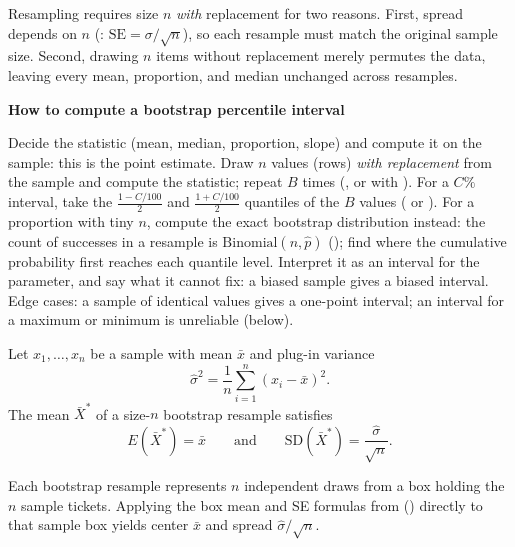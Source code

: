 \documentclass[10pt]{scrartcl}
\newenvironment{howto}[1]{\begin{mdframed}[style=howtostyle]{\color{NavyBlue}\textbf{#1}}\par\vspace{2pt}}{\end{mdframed}}
\begin{document}
Resampling requires size $n$ \emph{with} replacement for two reasons. First, spread depends on $n$ (: $\mathrm{SE} = \sigma/\sqrt{n}$), so each resample must match the original sample size. Second, drawing $n$ items without replacement merely permutes the data, leaving every mean, proportion, and median unchanged across resamples.

\begin{howto}{How to compute a bootstrap percentile interval}
\begin{steps}
  \ii Decide the statistic (mean, median, proportion, slope) and compute it on the sample: this is the point estimate.
  \ii Draw $n$ values (rows) \emph{with replacement} from the sample and compute the statistic; repeat $B$ times (, or  with ).
  \ii For a $C\%$ interval, take the $\frac{1-C/100}{2}$ and $\frac{1+C/100}{2}$ quantiles of the $B$ values ( or ).
  \ii For a proportion with tiny $n$, compute the exact bootstrap distribution instead: the count of successes in a resample is $\mathrm{Binomial}(n, \hat p)$ (); find where the cumulative probability first reaches each quantile level.
  \ii Interpret it as an interval for the parameter, and say what it cannot fix: a biased sample gives a biased interval.
  \ii Edge cases: a sample of identical values gives a one-point interval; an interval for a maximum or minimum is unreliable (below).
\end{steps}
\end{howto}

\begin{theorem*}
  Let $x_1,\dots,x_n$ be a sample with mean $\bar x$ and plug-in variance
  \[
    \hat\sigma^2 = \frac{1}{n}\sum_{i=1}^n (x_i - \bar x)^2 .
  \]
  The mean $\bar X^*$ of a size-$n$ bootstrap resample satisfies
  \[
    E(\bar X^*) = \bar x \qquad \text{and} \qquad \mathrm{SD}(\bar X^*) = \frac{\hat\sigma}{\sqrt{n}}.
  \]
\end{theorem*}

\begin{ideabox}
  Each bootstrap resample represents $n$ independent draws from a box holding the $n$ sample tickets. Applying the box mean and SE formulas from () directly to that sample box yields center $\bar x$ and spread $\hat\sigma/\sqrt{n}$.
\end{ideabox}
\end{document}
